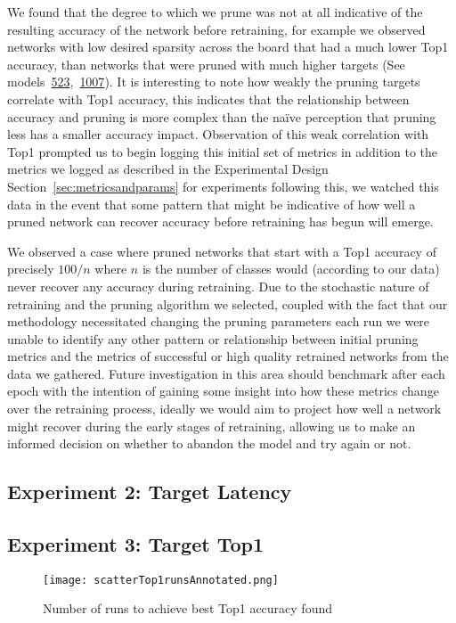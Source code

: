 \documentclass[../Dissertation.tex]{subfiles}
\begin{document}
We found that the degree to which we prune was not at all indicative of the resulting accuracy of the network before retraining, for example we observed networks with low desired sparsity across the board that had a much lower Top1 accuracy, than networks that were pruned with much higher targets (See models~\hyperref[sec:golden-sweep-523]{523},~\hyperref[sec:comfy-sweep-1007]{1007}).
It is interesting to note how weakly the pruning targets correlate with Top1 accuracy, this indicates that the relationship between accuracy and pruning is more complex than the naïve perception that pruning less has a smaller accuracy impact.
Observation of this weak correlation with Top1 prompted us to begin logging this initial set of metrics in addition to the metrics we logged as described in the Experimental Design Section~\ref{sec:metricsandparams} for experiments following this, we watched this data in the event that some pattern that might be indicative of how well a pruned network can recover accuracy before retraining has begun will emerge.

We observed a case where pruned networks that start with a Top1 accuracy of precisely $100 / n$ where $n$ is the number of classes would (according to our data) never recover any accuracy during retraining.
Due to the stochastic nature of retraining and the pruning algorithm we selected, coupled with the fact that our methodology necessitated changing the pruning parameters each run we were unable to identify any other pattern or relationship between initial pruning metrics and the metrics of successful or high quality retrained networks from the data we gathered. 
Future investigation in this area should benchmark after each epoch with the intention of gaining some insight into how these metrics change over the retraining process, ideally we would aim to project how well a network might recover during the early stages of retraining, allowing us to make an informed decision on whether to abandon the model and try again or not.


\subsection{Experiment 2: Target Latency}

\subsection{Experiment 3: Target Top1}

\begin{figure}[H]
    \centering
    \texttt{[image: scatterTop1runsAnnotated.png]}
    \caption{Number of runs to achieve best Top1 accuracy found}
\end{figure}
\end{document}
